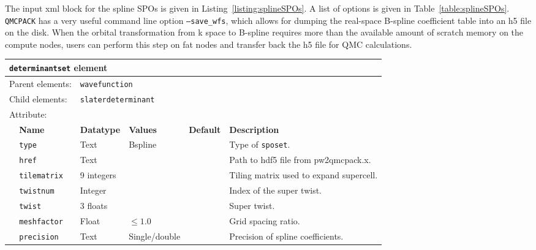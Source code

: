 The input xml block for the spline SPOs is given in Listing~\ref{listing:splineSPOs}. A list of options is given in 
Table~\ref{table:splineSPOs}. \texttt{QMCPACK} has a very useful command line option \texttt{--save\_wfs}, which allows for dumping 
the real-space B-spline coefficient table into an h5 file on the disk.
When the orbital transformation from k space to B-spline requires more than the available amount of scratch memory on the compute nodes, 
users can perform this step on fat nodes and transfer back the h5 file for QMC calculations.

\begin{table}[h]
\begin{center}
\begin{tabularx}{\textwidth}{l l l l l X }
\hline
\multicolumn{6}{l}{\texttt{determinantset} element} \\
\hline
\multicolumn{2}{l}{Parent elements:} & \multicolumn{4}{l}{\texttt{wavefunction}}\\
\multicolumn{2}{l}{Child  elements:} & \multicolumn{4}{l}{\texttt{slaterdeterminant}}\\
\multicolumn{2}{l}{Attribute:} & \multicolumn{4}{l}{}\\
   &   \bfseries Name                   & \bfseries Datatype & \bfseries Values & \bfseries Default & \bfseries Description \\
   &   \texttt{type}                    &  Text              &   Bspline        &                   &  Type of \texttt{sposet}. \\
   &   \texttt{href}                    &  Text              &                  &                   &  Path to hdf5 file from pw2qmcpack.x. \\
   &   \texttt{tilematrix}              &  9 integers        &                  &                   &  Tiling matrix used to expand supercell. \\
   &   \texttt{twistnum}                &  Integer           &                  &                   &  Index of the super twist. \\
   &   \texttt{twist}                   &  3 floats          &                  &                   &  Super twist. \\
   &   \texttt{meshfactor}              &  Float             &  $\le 1.0$       &                   &  Grid spacing ratio. \\
   &   \texttt{precision}               &  Text              &  Single/double   &                   &  Precision of spline coefficients. \\

\end{tabularx}
\end{center}
\end{table}
